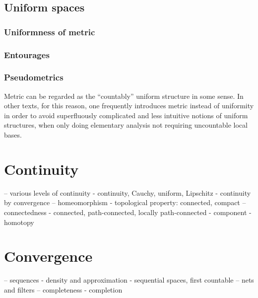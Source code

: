 \documentclass{../crs}
\begin{document}
\section{Uniform spaces}
\subsection{Uniformness of metric}
\subsection{Entourages}




\subsection{Pseudometrics}

Metric can be regarded as the ``countably'' uniform structure in some sense. 
In other texts, for this reason, one frequently introduces metric instead of uniformity in order to avoid superfluously complicated and less intuitive notions of uniform structures, when only doing elementary analysis not requiring uncountable local bases.























\chapter{Continuity}
-- various levels of continuity
- continuity, Cauchy, uniform, Lipschitz
- continuity by convergence
-- homeomorphism
- topological property: connected, compact
-- connectedness
- connected, path-connected, locally path-connected
- component
- homotopy













\chapter{Convergence}
-- sequences
- density and approximation
- sequential spaces, first countable
-- nets and filters
-- completeness
- completion
\end{document}
